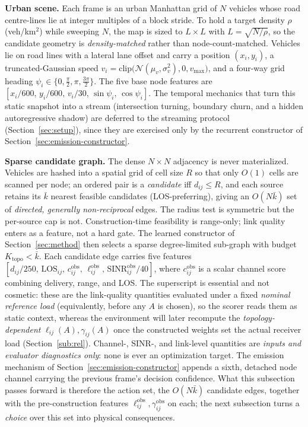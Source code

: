 \documentclass[journal]{IEEEtran}
\newcommand{\kcand}{\ensuremath{\bar k}}                 %
\newcommand{\Ktopo}{\ensuremath{K_{\mathrm{topo}}}}      %
\begin{document}
\textbf{Urban scene.} Each frame is an urban Manhattan grid of $N$
vehicles whose road centre-lines lie at integer multiples of a block stride. To
hold a target density $\rho$ (veh/km$^2$) while sweeping $N$, the map is sized to
$L\times L$ with $L=\sqrt{N/\rho}$, so the candidate geometry is
\emph{density-matched} rather than node-count-matched. Vehicles lie on road lines
with a lateral lane offset and carry a position $(x_i,y_i)$, a truncated-Gaussian
speed $v_i=\mathrm{clip}\!\big(\mathcal{N}(\mu_v,\sigma_v^2),0,v_{\max}\big)$, and
a four-way grid heading $\psi_i\in\{0,\tfrac{\pi}{2},\pi,\tfrac{3\pi}{2}\}$. The
five base node features are
$[x_i/600,\,y_i/600,\,v_i/30,\,\sin\psi_i,\,\cos\psi_i]$. The temporal mechanics
that turn this static snapshot into a stream (intersection turning, boundary
churn, and a hidden autoregressive shadow) are deferred to the streaming protocol
(Section~\ref{sec:setup}), since they are exercised only by the recurrent
constructor of Section~\ref{sec:emission-constructor}.

\textbf{Sparse candidate graph.} The dense $N\times N$ adjacency is never
materialized. Vehicles are hashed into a spatial grid of cell size $R$ so that
only $O(1)$ cells are scanned per node; an ordered pair is a \emph{candidate} iff
$d_{ij}\le R$, and each source retains its $\kcand$ nearest feasible candidates
(LOS-preferring), giving an $O(N\kcand)$ set of \emph{directed, generally
non-reciprocal} edges. The radius test is symmetric but the per-source cap is
not. Construction-time feasibility is range-only; link quality enters as a
feature, not a hard gate. The learned constructor of Section~\ref{sec:method}
then selects a sparse degree-limited sub-graph with budget $\Ktopo<\kcand$. Each
candidate edge carries five features
$[d_{ij}/250,\,\mathrm{LOS}_{ij},\,c_{ij}^{\mathrm{obs}},\,\ell_{ij}^{\mathrm{obs}},\,\mathrm{SINR}^{\mathrm{obs}}_{ij}/40]$,
where $c_{ij}^{\mathrm{obs}}$ is a scalar channel score combining delivery,
range, and LOS. The superscript is essential and not cosmetic: these are the
link-quality quantities evaluated under a fixed \emph{nominal reference load}
(equivalently, before any $A$ is chosen), so the scorer reads them as static
context, whereas the environment will later recompute the \emph{topology-dependent}
$\ell_{ij}(A),\gamma_{ij}(A)$ once the constructed weights set the actual
receiver load (Section~\ref{sub:rel}). Channel-, SINR-, and link-level quantities
are \emph{inputs and evaluator diagnostics only}: none is ever an optimization
target. The emission mechanism of Section~\ref{sec:emission-constructor} appends
a sixth, detached node channel carrying the previous frame's decision confidence.
What this subsection passes forward is therefore the action set, the $O(N\kcand)$
candidate edges, together with the pre-construction features
$\ell_{ij}^{\mathrm{obs}},\gamma_{ij}^{\mathrm{obs}}$ on each; the next subsection
turns a \emph{choice} over this set into physical consequences.
\end{document}
